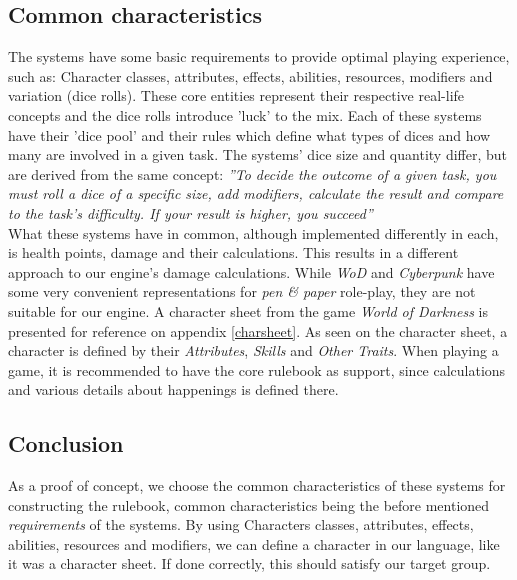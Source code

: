 \subsection*{Common characteristics}
\label{baseclasses}
The systems have some basic requirements to provide optimal playing experience, such as:
Character classes, attributes, effects, abilities, resources, modifiers and variation (dice rolls). These core entities represent their respective real-life concepts and the dice rolls introduce 'luck' to the mix.
Each of these systems have their 'dice pool' and their rules which define what types of dices and how many are involved in a given task.
The systems' dice size and quantity differ, but are derived from the same concept: \textit{''To decide the outcome of a given task, you must roll a dice of a specific size, add modifiers, calculate the result and compare to the task's difficulty. If your result is higher, you succeed''}\\

What these systems have in common, although implemented differently in each, is health points, damage and their calculations. This results in a different approach to our engine's damage calculations. While \emph{WoD} and \emph{Cyberpunk} have some very convenient representations for \emph{pen \& paper} role-play, they are not suitable for our engine. A character sheet from the game \emph{World of Darkness} is presented for reference on appendix \vref{charsheet}. As seen on the character sheet, a character is defined by their \emph{Attributes}, \emph{Skills} and \emph{Other Traits}. When playing a game, it is recommended to have the core rulebook as support, since calculations and various details about happenings is defined there.

\subsection*{Conclusion}
As a proof of concept, we choose the common characteristics of these systems for constructing the rulebook, common characteristics being the before mentioned \emph{requirements} of the systems.
By using Characters classes, attributes, effects, abilities, resources and modifiers, we can define a character in our language, like it was a character sheet. If done correctly, this should satisfy our target group.

